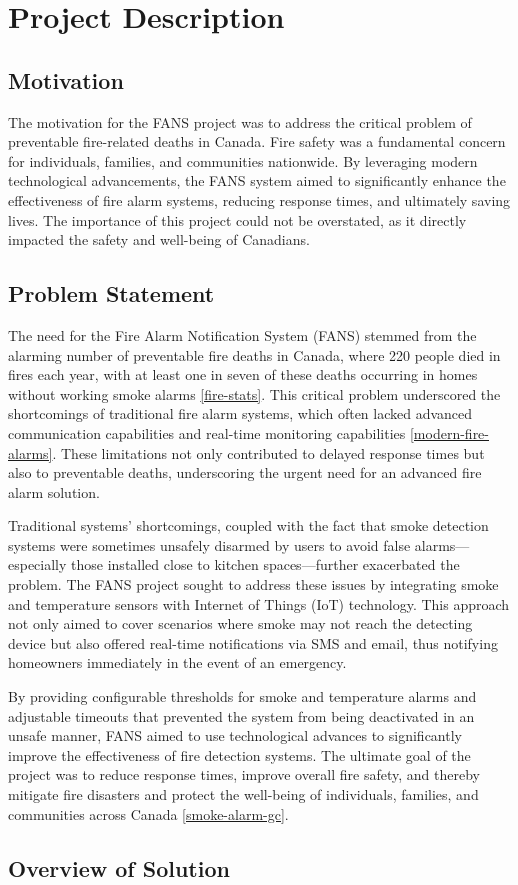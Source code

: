 \section{Project Description}

\subsection{Motivation}

The motivation for the FANS project was to address the critical problem of preventable fire-related deaths in Canada.
Fire safety was a fundamental concern for individuals, families, and communities nationwide. By leveraging modern
technological advancements, the FANS system aimed to significantly enhance the effectiveness of fire alarm systems,
reducing response times, and ultimately saving lives. The importance of this project could not be overstated, as it
directly impacted the safety and well-being of Canadians.

\subsection{Problem Statement}

The need for the Fire Alarm Notification System (FANS) stemmed from the alarming number of preventable fire deaths in
Canada, where 220 people died in fires each year, with at least one in seven of these deaths occurring in homes without
working smoke alarms \ref{fire-stats}. This critical problem underscored the shortcomings of traditional fire alarm
systems, which often lacked advanced communication capabilities and real-time monitoring capabilities
\ref{modern-fire-alarms}. These limitations not only contributed to delayed response times but also to preventable
deaths, underscoring the urgent need for an advanced fire alarm solution.

Traditional systems’ shortcomings, coupled with the fact that smoke detection systems were sometimes unsafely disarmed
by users to avoid false alarms—especially those installed close to kitchen spaces—further exacerbated the problem. The
FANS project sought to address these issues by integrating smoke and temperature sensors with Internet of Things (IoT)
technology. This approach not only aimed to cover scenarios where smoke may not reach the detecting device but also
offered real-time notifications via SMS and email, thus notifying homeowners immediately in the event of an emergency.

By providing configurable thresholds for smoke and temperature alarms and adjustable timeouts that prevented the system
from being deactivated in an unsafe manner, FANS aimed to use technological advances to significantly improve the
effectiveness of fire detection systems. The ultimate goal of the project was to reduce response times, improve overall
fire safety, and thereby mitigate fire disasters and protect the well-being of individuals, families, and communities
across Canada \ref{smoke-alarm-gc}.

\subsection{Overview of Solution}
